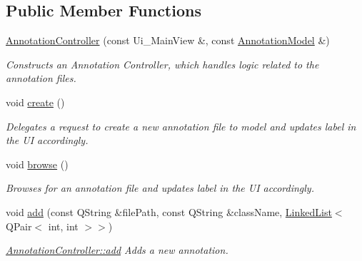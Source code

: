 \subsection*{Public Member Functions}
\begin{DoxyCompactItemize}
\item 
\hyperlink{classAnnotationController_a28cad1eb39c829d54093a965f59cdb2e}{Annotation\+Controller} (const Ui\+\_\+\+Main\+View \&, const \hyperlink{classAnnotationModel}{Annotation\+Model} \&)
\begin{DoxyCompactList}\small\item\em Constructs an Annotation Controller, which handles logic related to the annotation files. \end{DoxyCompactList}\item 
\mbox{\label{classAnnotationController_a490f659b6a1b6f4740925871689f747b}} 
void \hyperlink{classAnnotationController_a490f659b6a1b6f4740925871689f747b}{create} ()
\begin{DoxyCompactList}\small\item\em Delegates a request to create a new annotation file to model and updates label in the UI accordingly. \end{DoxyCompactList}\item 
\mbox{\label{classAnnotationController_aa79d79caa93863d2676900cece4cc994}} 
void \hyperlink{classAnnotationController_aa79d79caa93863d2676900cece4cc994}{browse} ()
\begin{DoxyCompactList}\small\item\em Browses for an annotation file and updates label in the UI accordingly. \end{DoxyCompactList}\item 
void \hyperlink{classAnnotationController_a4b9763e234bcf1a85acd0601a572c245}{add} (const Q\+String \&file\+Path, const Q\+String \&class\+Name, \hyperlink{classLinkedList}{Linked\+List}$<$ Q\+Pair$<$ int, int $>$$>$)
\begin{DoxyCompactList}\small\item\em \hyperlink{classAnnotationController_a4b9763e234bcf1a85acd0601a572c245}{Annotation\+Controller\+::add} Adds a new annotation. \end{DoxyCompactList}\item 
\mbox{\label{classAnnotationController_af0659045e204686026addab7c9534ed2}} 
$$
\end{DoxyCompactItemize}
